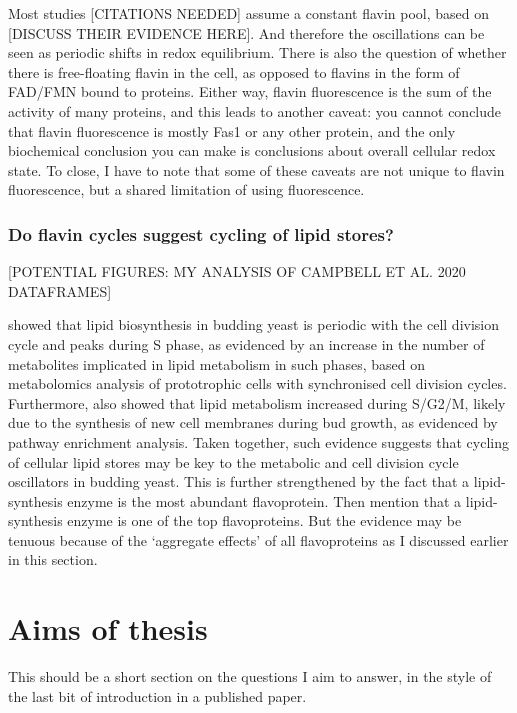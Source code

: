 Most studies [CITATIONS NEEDED] assume a constant flavin pool, based on [DISCUSS THEIR EVIDENCE HERE].
And therefore the oscillations can be seen as periodic shifts in redox equilibrium.
There is also the question of whether there is free-floating flavin in the cell, as opposed to flavins in the form of FAD/FMN bound to proteins.
Either way, flavin fluorescence is the sum of the activity of many proteins, and this leads to another caveat: you cannot conclude that flavin fluorescence is mostly Fas1 or any other protein, and the only biochemical conclusion you can make is conclusions about overall cellular redox state.
To close, I have to note that some of these caveats are not unique to flavin fluorescence, but a shared limitation of using fluorescence.

\subsubsection{Do flavin cycles suggest cycling of lipid stores?}
\label{subsubsec:intro-flavin-ymc-lipid_cycling}

[POTENTIAL FIGURES: MY ANALYSIS OF CAMPBELL ET AL. 2020 DATAFRAMES]

\textcite{campbellBuildingBlocksAre2020} showed that lipid biosynthesis in budding yeast is periodic with the cell division cycle and peaks during S phase, as evidenced by an increase in the number of metabolites implicated in lipid metabolism in such phases, based on metabolomics analysis of prototrophic cells with synchronised cell division cycles.
Furthermore, \textcite{ewaldYeastCyclinDependentKinase2016} also showed that lipid metabolism increased during S/G2/M, likely due to the synthesis of new cell membranes during bud growth, as evidenced by pathway enrichment analysis.
Taken together, such evidence suggests that cycling of cellular lipid stores may be key to the metabolic and cell division cycle oscillators in budding yeast.
This is further strengthened by the fact that a lipid-synthesis enzyme is the most abundant flavoprotein.
Then mention that a lipid-synthesis enzyme is one of the top flavoproteins.
But the evidence may be tenuous because of the `aggregate effects' of all flavoproteins as I discussed earlier in this section.


\section{Aims of thesis} %
\label{sec:intro-end}

This should be a short section on the questions I aim to answer, in the style of the last bit of introduction in a published paper.


